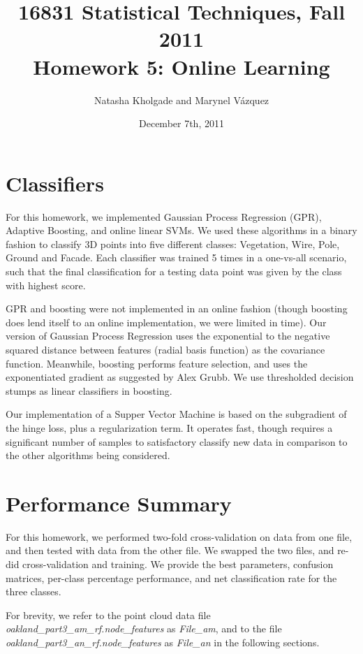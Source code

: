 \documentclass[letterpaper]{article}
\title{16831 Statistical Techniques, Fall 2011\\Homework 5: Online Learning}
\date{December 7th, 2011}
\author{Natasha Kholgade and Marynel V\'azquez}
\begin{document}
\maketitle

\section*{Classifiers}

For this homework, we implemented Gaussian Process Regression (GPR),
Adaptive Boosting, and online linear SVMs. We used these algorithms in a binary
fashion to classify 3D points into five different classes: Vegetation,
Wire, Pole, Ground and Facade. Each classifier was trained 5 times in
a one-vs-all scenario, such that the final classification for a
testing data point was given by the class with highest score.

GPR and boosting were not implemented in an online fashion (though
boosting does lend itself to an online implementation, we were limited
in time). Our version of Gaussian Process Regression uses the
exponential to the negative squared distance between features (radial
basis function) as the covariance function. Meanwhile, boosting
performs feature selection, and uses the exponentiated gradient as
suggested by Alex Grubb. We use thresholded decision stumps as linear
classifiers in boosting.

Our implementation of a Supper Vector Machine is based on the
subgradient of the hinge loss, plus a regularization term. It operates
fast, though requires a significant number of samples to satisfactory
classify new data in comparison to the other algorithms being
considered.

\section*{Performance Summary}

For this homework, we performed two-fold cross-validation on data from
one file, and then tested with data from the other file. We swapped
the two files, and re-did cross-validation and training. We provide
the best parameters, confusion matrices, per-class percentage
performance, and net classification rate for the three classes.

For brevity, we refer to the point cloud data file
\textit{oakland\_part3\_am\_rf.node\_features} as \textit{File\_am}, and
to the file \textit{oakland\_part3\_an\_rf.node\_features} as
\textit{File\_an} in the following sections.
\end{document}
